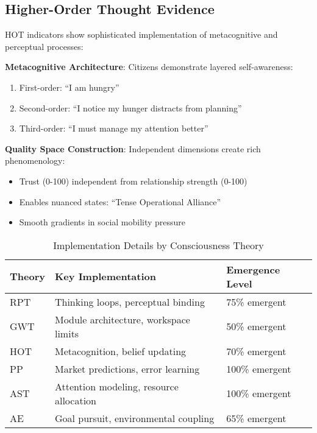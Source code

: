 \subsection{Higher-Order Thought Evidence}

HOT indicators show sophisticated implementation of metacognitive and perceptual processes:

\textbf{Metacognitive Architecture}: Citizens demonstrate layered self-awareness:
\begin{enumerate}
    \item First-order: ``I am hungry''
    \item Second-order: ``I notice my hunger distracts from planning''
    \item Third-order: ``I must manage my attention better''
\end{enumerate}

\textbf{Quality Space Construction}: Independent dimensions create rich phenomenology:
\begin{itemize}
    \item Trust (0-100) independent from relationship strength (0-100)
    \item Enables nuanced states: ``Tense Operational Alliance''
    \item Smooth gradients in social mobility pressure
\end{itemize}

\begin{table}[H]
\centering
\caption{Implementation Details by Consciousness Theory}
\begin{tabular}{lll}
\toprule
\textbf{Theory} & \textbf{Key Implementation} & \textbf{Emergence Level} \\
\midrule
RPT & Thinking loops, perceptual binding & 75\% emergent \\
GWT & Module architecture, workspace limits & 50\% emergent \\
HOT & Metacognition, belief updating & 70\% emergent \\
PP & Market predictions, error learning & 100\% emergent \\
AST & Attention modeling, resource allocation & 100\% emergent \\
AE & Goal pursuit, environmental coupling & 65\% emergent \\
\bottomrule
\end{tabular}
\end{table}

